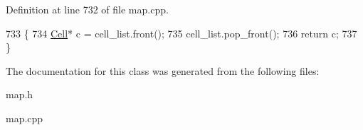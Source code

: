 Definition at line 732 of file map.\+cpp.


\begin{DoxyCode}
733 \{
734     \hyperlink{class_cell}{Cell}* c = cell\_list.front();
735     cell\_list.pop\_front();
736     \textcolor{keywordflow}{return} c;
737 \}
\end{DoxyCode}


The documentation for this class was generated from the following files\+:\begin{DoxyCompactItemize}
\item 
map.\+h\item 
map.\+cpp\end{DoxyCompactItemize}
